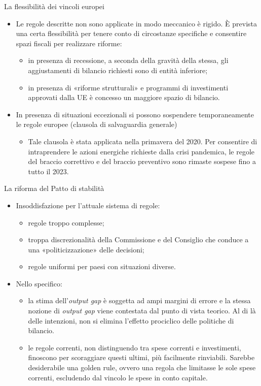 \documentclass[aspectratio=149,11pt,italian]{beamer}
\begin{document}
\begin{frame}{La flessibilità dei vincoli europei}
\begin{itemize}
\item Le regole descritte non sono applicate in modo meccanico è rigido. È
prevista una certa flessibilità per tenere conto di circostanze specifiche e
consentire spazi fiscali per realizzare riforme:
\begin{itemize}
\item in presenza di recessione, a seconda della gravità della stessa, gli
aggiustamenti di bilancio richiesti sono di entità inferiore;
\item in presenza di «riforme strutturali» e programmi di investimenti approvati
dalla UE è concesso un maggiore spazio di bilancio.
\end{itemize}
\item In presenza di situazioni eccezionali si possono sospendere temporaneamente
le regole europee (\alert{clausola di salvaguardia generale})
\begin{itemize}
\item Tale clausola è stata applicata nella primavera del 2020. Per consentire
di intraprendere le azioni energiche richieste dalla crisi pandemica, le
regole del braccio correttivo e del braccio preventivo sono rimaste
sospese fino a tutto il 2023.
\end{itemize}
\end{itemize}
\end{frame}

\begin{frame}{La riforma del Patto di stabilità}
\begin{itemize}
\item Insoddisfazione per l'attuale sistema di regole:
\begin{itemize}
\item regole troppo complesse;
\item troppa discrezionalità della Commissione e del Consiglio che conduce a una
«politicizzazione» delle decisioni;
\item regole uniformi per paesi con situazioni diverse.
\end{itemize}
\item Nello specifico:
\begin{itemize}
\item la stima dell'\emph{output gap} è soggetta ad ampi margini di errore e la
stessa nozione di \emph{output gap} viene contestata dal punto di vista
teorico. Al di là delle intenzioni, non si elimina l'effetto prociclico
delle politiche di bilancio.
\item le regole correnti, non distinguendo tra spese correnti e investimenti,
finoscono per scoraggiare questi ultimi, più facilmente
rinviabili. Sarebbe desiderabile una \alert{golden rule}, ovvero una regola che
limitasse le sole spese correnti, escludendo dal vincolo le spese in conto
capitale.
\end{itemize}
\end{itemize}
\end{frame}
\end{document}
